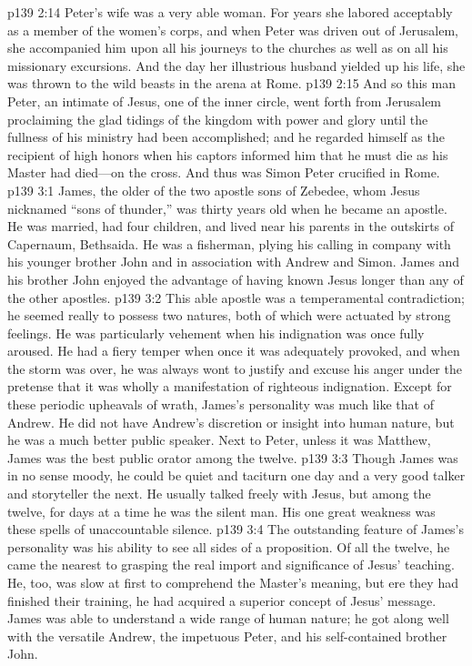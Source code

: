\pc \vs p139 2:14 Peter’s wife was a very able woman. For years she labored acceptably as a member of the women’s corps, and when Peter was driven out of Jerusalem, she accompanied him upon all his journeys to the churches as well as on all his missionary excursions. And the day her illustrious husband yielded up his life, she was thrown to the wild beasts in the arena at Rome.
\pc \vs p139 2:15 And so this man Peter, an intimate of Jesus, one of the inner circle, went forth from Jerusalem proclaiming the glad tidings of the kingdom with power and glory until the fullness of his ministry had been accomplished; and he regarded himself as the recipient of high honors when his captors informed him that he must die as his Master had died---on the cross. And thus was Simon Peter crucified in Rome.
\vs p139 3:1 James, the older of the two apostle sons of Zebedee, whom Jesus nicknamed “sons of thunder,” was thirty years old when he became an apostle. He was married, had four children, and lived near his parents in the outskirts of Capernaum, Bethsaida. He was a fisherman, plying his calling in company with his younger brother John and in association with Andrew and Simon. James and his brother John enjoyed the advantage of having known Jesus longer than any of the other apostles.
\pc \vs p139 3:2 This able apostle was a temperamental contradiction; he seemed really to possess two natures, both of which were actuated by strong feelings. He was particularly vehement when his indignation was once fully aroused. He had a fiery temper when once it was adequately provoked, and when the storm was over, he was always wont to justify and excuse his anger under the pretense that it was wholly a manifestation of righteous indignation. Except for these periodic upheavals of wrath, James’s personality was much like that of Andrew. He did not have Andrew’s discretion or insight into human nature, but he was a much better public speaker. Next to Peter, unless it was Matthew, James was the best public orator among the twelve.
\vs p139 3:3 Though James was in no sense moody, he could be quiet and taciturn one day and a very good talker and storyteller the next. He usually talked freely with Jesus, but among the twelve, for days at a time he was the silent man. His one great weakness was these spells of unaccountable silence.
\vs p139 3:4 The outstanding feature of James’s personality was his ability to see all sides of a proposition. Of all the twelve, he came the nearest to grasping the real import and significance of Jesus’ teaching. He, too, was slow at first to comprehend the Master’s meaning, but ere they had finished their training, he had acquired a superior concept of Jesus’ message. James was able to understand a wide range of human nature; he got along well with the versatile Andrew, the impetuous Peter, and his self\hyp{}contained brother John.
